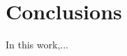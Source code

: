 \documentclass[conference]{IEEEtran}
\begin{document}

\section{Conclusions}
 In this work,...



\end{document}
